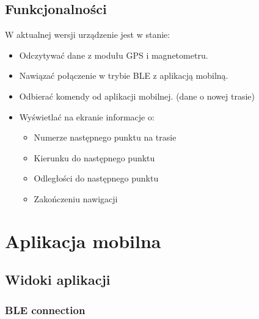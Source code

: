 \subsection{Funkcjonalności}
W aktualnej wersji urządzenie jest w stanie:
\begin{itemize}
    \item Odczytywać dane z modułu GPS i magnetometru.
    \item Nawiązać połączenie w trybie BLE z aplikacją mobilną.
    \item Odbierać komendy od aplikacji mobilnej. (dane o nowej trasie)
    \item Wyświetlać na ekranie informacje o:
          \begin{itemize}
              \item Numerze następnego punktu na trasie
              \item Kierunku do następnego punktu
              \item Odległości do następnego punktu
              \item Zakończeniu nawigacji
          \end{itemize}
\end{itemize}

\section{Aplikacja mobilna}
\subsection{Widoki aplikacji}
\subsubsection{BLE connection}

